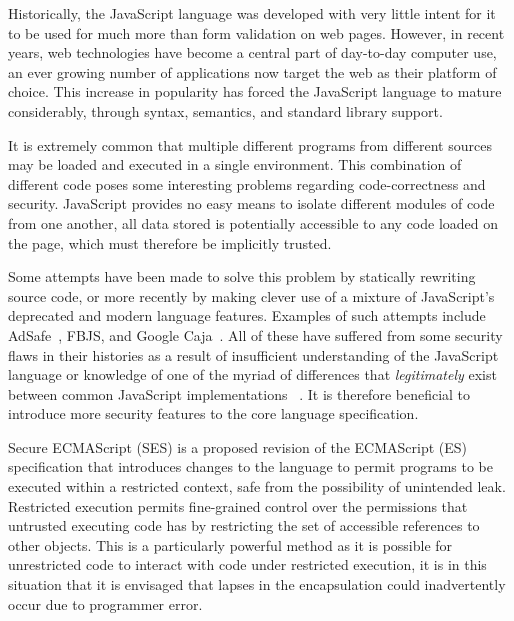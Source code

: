 \documentclass[a4paper,notitlepage]{report}
\begin{document}

  Historically, the JavaScript language was developed with very little intent
  for it to be used for much more than form validation on web pages.
  However, in recent years, web technologies have become a central part of
  day-to-day computer use, an ever growing number of applications now target the
  web as their platform of choice.
  This increase in popularity has forced the JavaScript language to mature
  considerably, through syntax, semantics, and standard library support.

  It is extremely common
  that multiple different programs from different sources may be loaded and
  executed in a single environment. This combination of different code poses
  some interesting problems regarding code-correctness and security. JavaScript
  provides no easy means to isolate different modules of code from one another,
  all data stored is potentially accessible to any code loaded on the page,
  which must therefore be implicitly trusted.

  Some attempts have been made to solve this problem by statically rewriting
  source code, or more recently by making clever use of
  a mixture of JavaScript's deprecated and modern language features.
  Examples of such attempts include AdSafe~\cite{AdSafe}, FBJS, and
  Google Caja~\cite{miller2008caja}.
  All of these have suffered from some security
  flaws in their histories as a
  result of insufficient understanding of the JavaScript language or knowledge
  of one of the myriad of differences that \emph{legitimately} exist between
  common JavaScript implementations~
  \cite{maffeis2009jsisolation, maffeis2010object-cap, ses-semantics}.
  It is therefore beneficial to introduce more security features to the core
  language specification.

  Secure ECMAScript (SES) is a proposed revision of the ECMAScript (ES)
  specification that introduces changes to the language to permit programs to be
  executed within a restricted context, safe from the possibility of unintended
  leak.
  Restricted execution permits fine-grained control over the permissions that
  untrusted executing code has by restricting the set of accessible references
  to other objects.
  This is a particularly powerful method as it is possible for unrestricted code
  to interact with code under restricted execution, it is in this situation that
  it is envisaged that lapses in the encapsulation could inadvertently occur due
  to programmer error.
\end{document}
